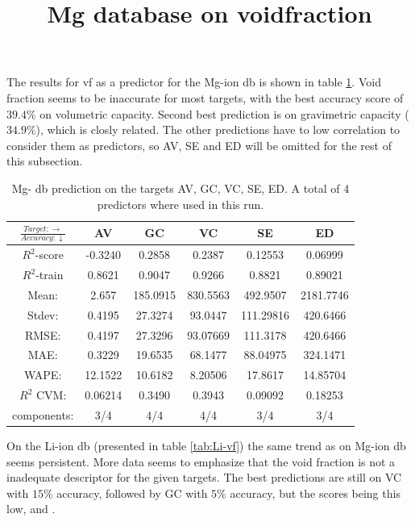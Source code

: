The results for vf as a predictor for the Mg-ion db is shown in table \ref{tab:mg_vg}. Void fraction seems to be inaccurate for most targets, with the best accuracy score of $39.4\%$ on volumetric capacity. Second best prediction is on gravimetric capacity ($34.9\%$), which is closly related. The other predictions have to low correlation to consider them as predictors, so AV, SE and ED will be omitted for the rest of this subsection.

\begin{table}[h]
\normalsize
\centering
\caption{Mg- db prediction on the targets AV, GC, VC, SE, ED. A total of 4 predictors where used in this run.}
\title{Mg database on voidfraction}
\begin{tabular}{|c|c|c|c|c|c|}
	\hline 
	$\frac{Target: \rightarrow}{Accuracy:\downarrow} $ & AV & GC & VC & SE & ED 
	 \\ 
	\hline
	$R^2$-score & -0.3240 & 0.2858 & 0.2387 & 0.12553 &  0.06999\\ 
	\hline 
	$R^2$-train & 0.8621 &  0.9047 & 0.9266 & 0.8821 & 0.89021 \\ 
	\hline
	Mean: 	& 2.657	&185.0915&830.5563& 492.9507	&2181.7746\\
	\hline 
	Stdev:	&0.4195	&27.3274	&93.0447&111.29816	&420.6466\\
	\hline 
	RMSE:	 &0.4197& 27.3296 &  93.07669 & 111.3178 & 420.6466 \\ 
	\hline
	MAE: 	& 0.3229 & 19.6535& 68.1477 & 88.04975 & 324.1471 \\ 
	\hline
	WAPE: 	& 12.1522 & 10.6182 & 8.20506  & 17.8617 & 14.85704 \\
	\hline
	$R^2$ CVM: & 0.06214 &  0.3490 & 0.3943  & 0.09092 & 0.18253 \\
	\hline
	components: & 3/4 	& 4/4 	& 4/4 	 & 3/4	 & 3/4 \\
	\hline
\end{tabular}
\label{tab:mg_vg}
\end{table}




On the Li-ion db (presented in table \ref{tab:Li-vf}) the same trend as on Mg-ion db seems persistent. More data seems to emphasize that the void fraction is not a inadequate descriptor for the given targets. The best predictions are still on VC with $15\%$ accuracy, followed by GC  with $5\%$ accuracy, but the scores being this low, and  . 

